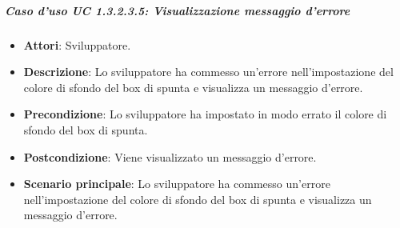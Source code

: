 \subparagraph{Caso d'uso UC 1.3.2.3.5: Visualizzazione messaggio d'errore}

\FloatBarrier
\begin{itemize}
\item\textbf{Attori}: Sviluppatore.
\item\textbf{Descrizione}: Lo sviluppatore ha commesso un'errore nell'impostazione del colore di sfondo del box di spunta e visualizza un messaggio d'errore.
\item\textbf{Precondizione}: Lo sviluppatore ha impostato in modo errato il colore di sfondo del box di spunta.
\item\textbf{Postcondizione}: Viene visualizzato un messaggio d'errore.
\item\textbf{Scenario principale}: Lo sviluppatore ha commesso un'errore nell'impostazione del colore di sfondo del box di spunta e visualizza un messaggio d'errore.
\end{itemize}